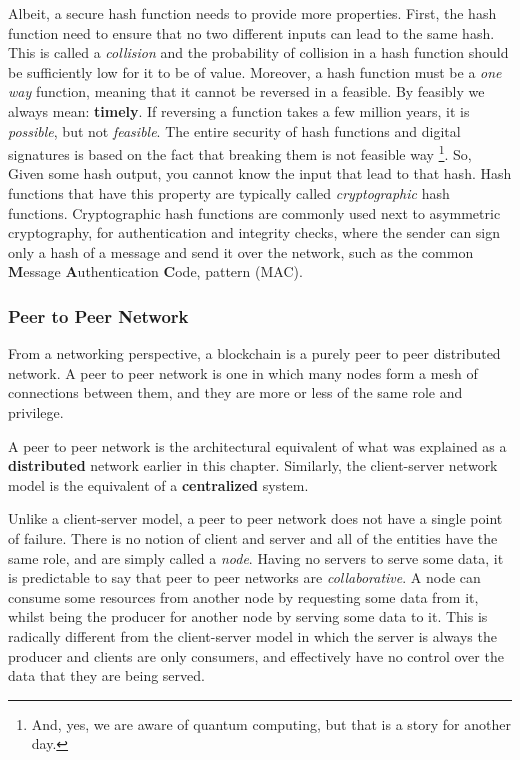 Albeit, a secure hash function needs to provide more properties. First, the hash function need to
ensure that no two different inputs can lead to the same hash. This is called a \textit{collision}
and the probability of collision in a hash function should be sufficiently low for it to be of
value. Moreover, a hash function must be a \textit{one way} function, meaning that it cannot be
reversed in a feasible. By feasibly we always mean: \textbf{timely}. If reversing a function takes a
few million years, it is \textit{possible}, but not \textit{feasible}. The entire security of hash
functions and digital signatures is based on the fact that breaking them is not feasible way
\footnote{And, yes, we are aware of quantum computing, but that is a story for another day.}. So,
Given some hash output, you cannot know the input that lead to that hash. Hash functions that have
this property are typically called \textit{cryptographic} hash functions. Cryptographic hash
functions are commonly used next to asymmetric cryptography, for authentication and integrity
checks, where the sender can sign only a hash of a message and send it over the network, such as the
common \textbf{M}essage \textbf{A}uthentication \textbf{C}ode, pattern
\cite{bellareKeyingHashFunctions1996} (MAC).

\subsubsection{Peer to Peer Network} \label{chap_bg:subsec:p2p}

From a networking perspective, a blockchain is a purely peer to peer distributed network. A peer to
peer network is one in which many nodes form a mesh of connections between them, and they are more
or less of the same role and privilege.

\begin{remark}
	A peer to peer network is the architectural equivalent of what was explained as a
	\textbf{distributed} network earlier in this chapter. Similarly, the client-server network model
	is the equivalent of a \textbf{centralized} system.
\end{remark}


Unlike a client-server model, a peer to peer network does not have a single point of failure. There
is no notion of client and server and all of the entities have the same role, and are simply called
a \textit{node}. Having no servers to serve some data, it is predictable to say that peer to peer
networks are \textit{collaborative}. A node can consume some resources from another node by
requesting some data from it, whilst being the producer for another node by serving some data to it.
This is radically different from the client-server model in which the server is always the producer
and clients are only consumers, and effectively have no control over the data that they are being
served.

